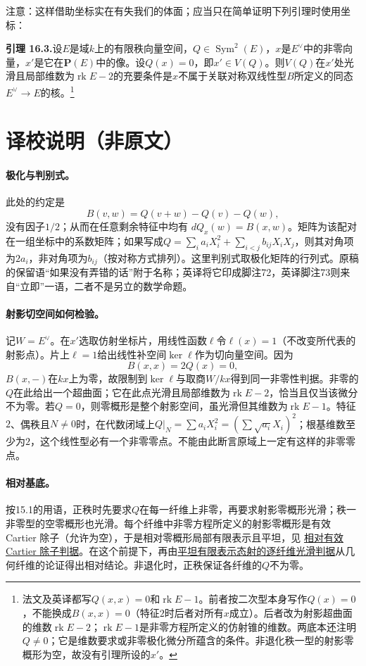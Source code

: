 \documentclass[openany,fontset=fandol]{ctexbook}
\DeclareMathOperator{\Sym}{Sym}
\DeclareMathOperator{\rk}{rk}
\begin{document}
注意：这样借助坐标实在有失我们的体面；应当只在简单证明下列引理时使用坐标：

\noindent\textbf{引理 16.3.}\quad 设$E$是域$k$上的有限秩向量空间，$Q\in\Sym^2(E)$，$x$是$E^\vee$中的非零向量，$x'$是它在$\mathbf P(E)$中的像。设$Q(x)=0$，即$x'\in V(Q)$。则$V(Q)$在$x'$处光滑且局部维数为$\rk E-2$的充要条件是$x$不属于关联对称双线性型$B$所定义的同态$E^\vee\to E$的核。\footnote{法文及英译都写$Q(x,x)=0$和$\rk E-1$。前者按二次型本身写作$Q(x)=0$，不能换成$B(x,x)=0$（特征$2$时后者对所有$x$成立）。后者改为射影超曲面的维数$\rk E-2$；$\rk E-1$是非零方程所定义的仿射锥的维数。两底本还注明$Q\ne0$；它是维数要求或非零极化微分所蕴含的条件。非退化秩一型的射影零概形为空，故没有引理所设的$x'$。}

\section*{译校说明（非原文）}
\begingroup\small
\paragraph{极化与判别式。}
此处的约定是
\[
B(v,w)=Q(v+w)-Q(v)-Q(w),
\]
没有因子$1/2$；从而在任意剩余特征中均有
$dQ_x(w)=B(x,w)$。矩阵为该配对在一组坐标中的系数矩阵；如果写成$Q=\sum_i a_i X_i^2+\sum_{i<j} b_{ij}X_iX_j$，则其对角项为$2a_i$，非对角项为$b_{ij}$（按对称方式排列）。这里判别式取极化矩阵的行列式。原稿的保留语“如果没有弄错的话”附于名称；英译将它印成脚注72，英译脚注73则来自“立即”一语，二者不是另立的数学命题。

\paragraph{射影切空间如何检验。}
记$W=E^\vee$。在$x'$选取仿射坐标片，用线性函数$\ell$令$\ell(x)=1$（不改变所代表的射影点）。片上$\ell=1$给出线性补空间$\ker\ell$作为切向量空间。因为
\[
B(x,x)=2Q(x)=0,
\]
$B(x,-)$在$kx$上为零，故限制到$\ker\ell$与取商$W/kx$得到同一非零性判据。非零的$Q$在此给出一个超曲面；它在此点光滑且局部维数为$\rk E-2$，恰当且仅当该微分不为零。若$Q=0$，则零概形是整个射影空间，虽光滑但其维数为$\rk E-1$。特征$2$、偶秩且$N\ne0$时，在代数闭域上$Q|_N=\sum a_i X_i^2=(\sum\sqrt{a_i}X_i)^2$；根基维数至少为$2$，这个线性型必有一个非零零点。不能由此断言原域上一定有这样的非零零点。

\paragraph{相对基底。}
按15.1的用语，正秩时先要求$Q$在每一纤维上非零，再要求射影零概形光滑；秩一非零型的空零概形也光滑。每个纤维中非零方程所定义的射影零概形是有效 Cartier 除子（允许为空），于是相对零概形局部有限表示且平坦，见 \href{https://stacks.math.columbia.edu/tag/062Y}{相对有效 Cartier 除子判据}。在这个前提下，再由\href{https://stacks.math.columbia.edu/tag/01V8}{平坦有限表示态射的逐纤维光滑判据}从几何纤维的论证得出相对结论。非退化时，正秩保证各纤维的$Q$不为零。
\par\endgroup
\end{document}
